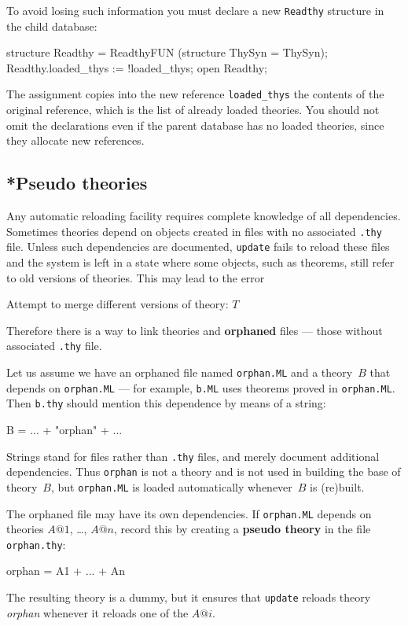 To avoid losing such information you must declare a new {\tt Readthy}
structure in the child database:
\begin{ttbox}
structure Readthy = ReadthyFUN (structure ThySyn = ThySyn);
Readthy.loaded_thys := !loaded_thys;
open Readthy;
\end{ttbox}
The assignment copies into the new reference \verb$loaded_thys$ the
contents of the original reference, which is the list of already loaded
theories.  You should not omit the declarations even if the parent database
has no loaded theories, since they allocate new references.


\subsection{*Pseudo theories}
Any automatic reloading facility requires complete knowledge of all
dependencies.  Sometimes theories depend on objects created in \ML{} files
with no associated {\tt.thy} file.  Unless such dependencies are documented,
{\tt update} fails to reload these \ML{} files and the system is left in a
state where some objects, such as theorems, still refer to old versions of
theories.  This may lead to the error
\begin{ttbox}
Attempt to merge different versions of theory: \(T\)
\end{ttbox}
Therefore there is a way to link theories and {\bf orphaned} \ML{} files ---
those without associated {\tt.thy} file.

Let us assume we have an orphaned \ML{} file named {\tt orphan.ML} and a
theory~$B$ that depends on {\tt orphan.ML} --- for example, {\tt b.ML} uses
theorems proved in {\tt orphan.ML}.  Then {\tt b.thy} should
mention this dependence by means of a string:
\begin{ttbox}
B = ... + "orphan" + ...
\end{ttbox}
Strings stand for \ML{} files rather than {\tt.thy} files, and merely
document additional dependencies.  Thus {\tt orphan} is not a theory and is
not used in building the base of theory~$B$, but {\tt orphan.ML} is loaded
automatically whenever~$B$ is (re)built.

The orphaned file may have its own dependencies.  If {\tt orphan.ML}
depends on theories $A@1$, \ldots, $A@n$, record this by creating a {\bf
  pseudo theory} in the file {\tt orphan.thy}:
\begin{ttbox}
orphan = A1 + \(...\) + An
\end{ttbox}
The resulting theory is a dummy, but it ensures that {\tt update} reloads
theory {\it orphan} whenever it reloads one of the $A@i$.

